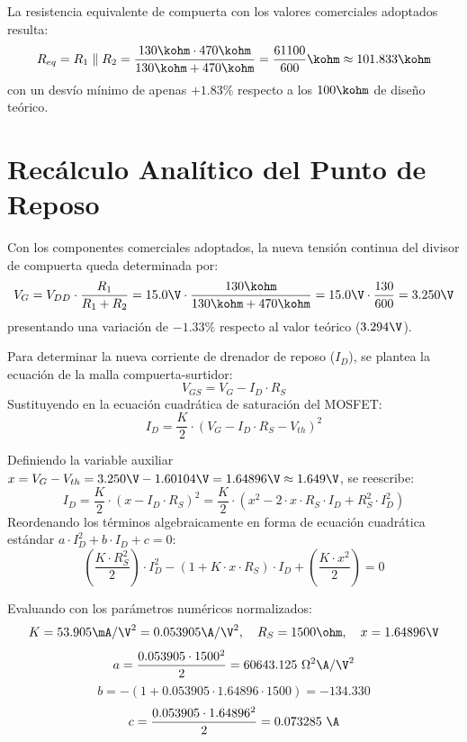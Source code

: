 La resistencia equivalente de compuerta con los valores comerciales adoptados resulta:
\begin{equation}
  R_{eq} = R_1 \parallel R_2 = \frac{130\kohm \cdot 470\kohm}{130\kohm + 470\kohm} = \frac{61100}{600}\kohm \approx 101.833\kohm
  \label{eq:Req_norm}
\end{equation}
con un desvío mínimo de apenas $+1.83\%$ respecto a los $100\kohm$ de diseño teórico.

\section{Recálculo Analítico del Punto de Reposo}

Con los componentes comerciales adoptados, la nueva tensión continua del divisor de compuerta queda determinada por:
\begin{equation}
  V_G = V_{DD} \cdot \frac{R_1}{R_1 + R_2} = 15.0\V \cdot \frac{130\kohm}{130\kohm + 470\kohm} = 15.0\V \cdot \frac{130}{600} = 3.250\V
  \label{eq:VG_norm}
\end{equation}
presentando una variación de $-1.33\%$ respecto al valor teórico ($3.294\V$).

Para determinar la nueva corriente de drenador de reposo ($I_D$), se plantea la ecuación de la malla compuerta-surtidor:
\begin{equation}
  V_{GS} = V_G - I_D \cdot R_S
  \label{eq:malla_vgs}
\end{equation}
Sustituyendo en la ecuación cuadrática de saturación del MOSFET:
\begin{equation}
  I_D = \frac{K}{2} \cdot (V_G - I_D \cdot R_S - V_{th})^2
\end{equation}

Definiendo la variable auxiliar $x = V_G - V_{th} = 3.250\V - 1.60104\V = 1.64896\V \approx 1.649\V$, se reescribe:
\begin{equation}
  I_D = \frac{K}{2} \cdot (x - I_D \cdot R_S)^2 = \frac{K}{2} \cdot \left(x^2 - 2 \cdot x \cdot R_S \cdot I_D + R_S^2 \cdot I_D^2\right)
\end{equation}
Reordenando los términos algebraicamente en forma de ecuación cuadrática estándar $a \cdot I_D^2 + b \cdot I_D + c = 0$:
\begin{equation}
  \left(\frac{K \cdot R_S^2}{2}\right) \cdot I_D^2 - (1 + K \cdot x \cdot R_S) \cdot I_D + \left(\frac{K \cdot x^2}{2}\right) = 0
  \label{eq:cuadratica_ID}
\end{equation}

Evaluando con los parámetros numéricos normalizados:
\begin{equation*}
  K = 53.905\mA/\V^2 = 0.053905\A/\V^2, \quad R_S = 1500\ohm, \quad x = 1.64896\V
\end{equation*}
\begin{equation}
  a = \frac{0.053905 \cdot 1500^2}{2} = 60643.125\ \Omega^2\A/\V^2
\end{equation}
\begin{equation}
  b = -(1 + 0.053905 \cdot 1.64896 \cdot 1500) = -134.330
\end{equation}
\begin{equation}
  c = \frac{0.053905 \cdot 1.64896^2}{2} = 0.073285\ \A
\end{equation}

